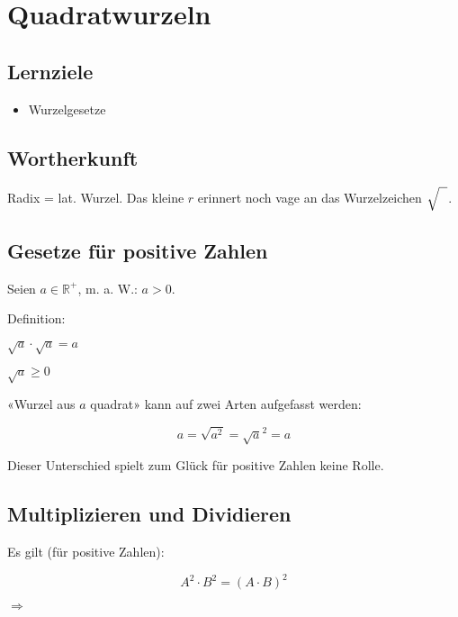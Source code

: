 \newpage
\section{Quadratwurzeln}\index{$\sqrt{\mathstrut{}\,}$}

\subsection*{Lernziele}

\begin{itemize}
\item Wurzelgesetze 
\end{itemize}

\subsection{Wortherkunft}
Radix = lat. Wurzel.
Das kleine $r$ erinnert noch vage an das Wurzelzeichen $\sqrt{\strut{}\ \ }$.

\subsection{Gesetze für positive Zahlen}
Seien $a \in \mathbb{R^+}$, m. a. W.: $a>0$.

Definition:

$\sqrt{a} \cdot \sqrt{a} = a$

$\sqrt{a} \ge 0$

«Wurzel aus $a$ quadrat» kann auf zwei Arten aufgefasst werden:

$$a = \sqrt{a^2} = \sqrt{a}^2 = a$$

Dieser Unterschied spielt zum Glück für positive Zahlen keine Rolle.


\newpage
\subsection{Multiplizieren und Dividieren}
Es gilt (für positive Zahlen):

$$A^2\cdot B^2 = (A\cdot B)^2$$

$\Rightarrow$

